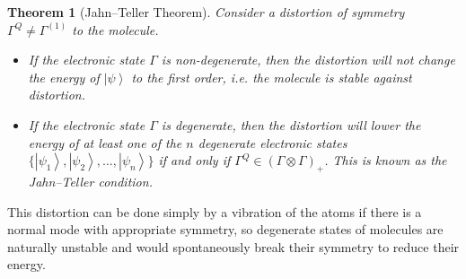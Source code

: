 \documentclass{article}
\theoremstyle{plain}\theoremheaderfont{\normalfont\itshape}\theorembodyfont{\rmfamily}\theoremseparator{.}\newtheorem*{rem}{Remark}\newtheorem*{ex}{Example}\newtheorem*{proof}{Proof}\newtheorem*{altp}{Alternative proof}
\theoremstyle{plain}\theoremheaderfont{\normalfont\bfseries}\theorembodyfont{\rmfamily}\theoremseparator{.}\newtheorem{thm}{Theorem}[section]\newtheorem{lem}[thm]{Lemma}\newtheorem{prop}[thm]{Proposition}\newtheorem*{cor}{Corollary}\newtheorem{defn}[thm]{Definition}\newtheorem{clm}[thm]{Claim}\newtheorem{clminproof}{Claim}\newtheorem*{law}{Law}\newtheorem{pos}[thm]{Postulate}
\theoremstyle{break}\theoremheaderfont{\normalfont\itshape}\theorembodyfont{\rmfamily}\theoremseparator{.\medskip}\newtheorem*{proofskip}{Proof}\newtheorem*{exs}{Examples}\newtheorem*{rems}{Remarks}
\theoremstyle{break}\theoremheaderfont{\normalfont\bfseries}\theorembodyfont{\rmfamily}\theoremseparator{.\medskip}\newtheorem{lemskip}[thm]{Lemma}\newtheorem{defnskip}[thm]{Definition}\newtheorem{propskip}[thm]{Proposition}\newtheorem{thmskip}[thm]{Theorem}
\numberwithin{equation}{section}
\newcommand{\ket}[1]{\left| #1 \right\rangle}
\begin{document}
    \begin{thm}[Jahn--Teller Theorem]
        Consider a distortion of symmetry \(\Gamma^Q\ne\Gamma^{(1)}\) to the molecule.
        \begin{itemize}[topsep=0pt]
            \item If the electronic state \(\Gamma\) is non-degenerate, then the distortion will not change the energy of \(\ket{\psi}\) to the first order, i.e. the molecule is stable against distortion.
            \item If the electronic state \(\Gamma\) is degenerate, then the distortion will lower the energy of at least one of the \(n\) degenerate electronic states \(\{\ket{\psi_1},\ket{\psi_2},\dots,\ket{\psi_n}\}\) if and only if \(\Gamma^Q\in (\Gamma\otimes\Gamma)_+\). This is known as the \textit{Jahn--Teller condition}.
        \end{itemize}
    \end{thm}
    This distortion can be done simply by a vibration of the atoms if there is a normal mode with appropriate symmetry, so degenerate states of molecules are naturally unstable and would spontaneously break their symmetry to reduce their energy.
\end{document}
